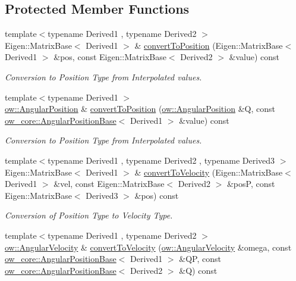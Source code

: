 \subsection*{Protected Member Functions}
\begin{DoxyCompactItemize}
\item 
{\footnotesize template$<$typename Derived1 , typename Derived2 $>$ }\\Eigen\+::\+Matrix\+Base$<$ Derived1 $>$ \& \hyperlink{classow__core_1_1StateTrajectory_ade4a5fcfa295974628599788cb7bb3e5}{convert\+To\+Position} (Eigen\+::\+Matrix\+Base$<$ Derived1 $>$ \&pos, const Eigen\+::\+Matrix\+Base$<$ Derived2 $>$ \&value) const 
\begin{DoxyCompactList}\small\item\em Conversion to Position Type from Interpolated values. \end{DoxyCompactList}\item 
{\footnotesize template$<$typename Derived1 $>$ }\\\hyperlink{classow__core_1_1AngularPosition}{ow\+::\+Angular\+Position} \& \hyperlink{classow__core_1_1StateTrajectory_a23ef9887890f8547f8b381086bd726b8}{convert\+To\+Position} (\hyperlink{classow__core_1_1AngularPosition}{ow\+::\+Angular\+Position} \&Q, const \hyperlink{classow__core_1_1AngularPositionBase}{ow\+\_\+core\+::\+Angular\+Position\+Base}$<$ Derived1 $>$ \&value) const 
\begin{DoxyCompactList}\small\item\em Conversion to Position Type from Interpolated values. \end{DoxyCompactList}\item 
{\footnotesize template$<$typename Derived1 , typename Derived2 , typename Derived3 $>$ }\\Eigen\+::\+Matrix\+Base$<$ Derived1 $>$ \& \hyperlink{classow__core_1_1StateTrajectory_adc6c9006c12582832a73928fd15f7700}{convert\+To\+Velocity} (Eigen\+::\+Matrix\+Base$<$ Derived1 $>$ \&vel, const Eigen\+::\+Matrix\+Base$<$ Derived2 $>$ \&posP, const Eigen\+::\+Matrix\+Base$<$ Derived3 $>$ \&pos) const 
\begin{DoxyCompactList}\small\item\em Conversion of Position Type to Velocity Type. \end{DoxyCompactList}\item 
{\footnotesize template$<$typename Derived1 , typename Derived2 $>$ }\\\hyperlink{classow__core_1_1AngularVelocity}{ow\+::\+Angular\+Velocity} \& \hyperlink{classow__core_1_1StateTrajectory_a13ac659f8ca776faa093da46055fbf4b}{convert\+To\+Velocity} (\hyperlink{classow__core_1_1AngularVelocity}{ow\+::\+Angular\+Velocity} \&omega, const \hyperlink{classow__core_1_1AngularPositionBase}{ow\+\_\+core\+::\+Angular\+Position\+Base}$<$ Derived1 $>$ \&QP, const \hyperlink{classow__core_1_1AngularPositionBase}{ow\+\_\+core\+::\+Angular\+Position\+Base}$<$ Derived2 $>$ \&Q) const 

\end{DoxyCompactItemize}
